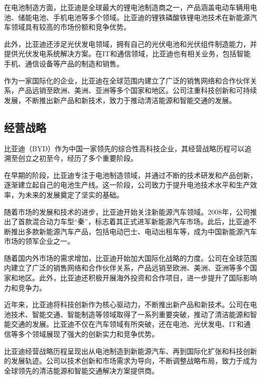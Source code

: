 在电池制造方面，比亚迪是全球最大的锂电池制造商之一，产品涵盖电动车辆用电池、储能电池、手机电池等多个领域。比亚迪的锂铁磷酸铁锂电池技术在新能源汽车领域具有较高的市场份额和竞争优势。

此外，比亚迪还涉足光伏发电领域，拥有自己的光伏电池和光伏组件制造能力，并提供光伏发电系统解决方案。在IT和通信领域，比亚迪也有相关业务，包括智能手机、通信设备等产品的制造和销售。

作为一家国际化的企业，比亚迪在全球范围内建立了广泛的销售网络和合作伙伴关系，产品远销至欧洲、美洲、亚洲等多个国家和地区。公司注重科技创新和可持续发展，不断推出新产品和新技术，致力于推动清洁能源和智能交通的发展。
\subsection{经营战略}
比亚迪（BYD）作为中国一家领先的综合性高科技企业，其经营战略历程可以追溯至创立之初至今，经历了多个重要阶段。

在早期的阶段，比亚迪专注于电池制造领域，并通过不断的技术研发和产品创新，逐渐建立起自己的电池生产线。这一阶段，公司致力于提升电池技术水平和生产效率，为未来的发展奠定了坚实的基础。

随着市场的发展和技术的进步，比亚迪开始关注新能源汽车领域。2008年，公司推出了首款混合动力车型“秦”，标志着其正式进军新能源汽车市场。此后，比亚迪不断推出多款新能源汽车产品，包括电动巴士、电动出租车等，成为中国新能源汽车市场的领军企业之一。

随着国内外市场的需求增加，比亚迪开始加大国际化战略的力度。公司在全球范围内建立了广泛的销售网络和合作伙伴关系，产品远销至欧洲、美洲、亚洲等多个国家和地区。此外，比亚迪还积极开展海外投资和合作项目，进一步提升了国际影响力和竞争力。

近年来，比亚迪将科技创新作为核心驱动力，不断推出新产品和新技术。公司在电池技术、智能交通、智能制造等领域取得了一系列重要突破，推动了清洁能源和智能交通的发展。比亚迪不仅在汽车领域有所突破，还在电池、光伏发电、IT和通信等多个领域展现了强大的创新实力和竞争优势。

比亚迪经营战略历程呈现出从电池制造到新能源汽车、再到国际化扩张和科技创新的发展轨迹。公司以技术创新和市场需求为导向，不断调整战略布局，致力于成为全球领先的清洁能源和智能交通解决方案提供商。
